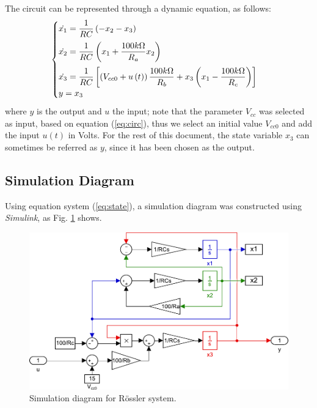 The circuit can be represented through a dynamic equation, as follows:
\begin{equation}
\begin{cases}
	\dot{x_1}=\dfrac{1}{RC}\left(-x_2-x_3\right)&\vspace{2mm}\\\vspace{2mm}
	\dot{x_2}=\dfrac{1}{RC}\left(x_1+\dfrac{100k\Omega}{R_a}x_2\right)&\\
	\dot{x_3}=\dfrac{1}{RC}\left[\left(V_{cc0}+u\left(t\right)\right)\dfrac{100k\Omega}{R_b}+x_3\left(x_1-\dfrac{100k\Omega}{R_c}\right)\right]&\\
	y = x_3
\end{cases}
\label{eq:state}
\end{equation}
where $y$ is the output and $u$ the input; note that the parameter $V_{cc}$ was selected as input, based on equation (\ref{eq:circ}), thus we select an initial value $V_{cc0}$ and add the input $u\left(t\right)$ in Volts. For the rest of this document, the state variable $x_3$ can sometimes be referred as $y$, since it has been chosen as the output.

\subsection{Simulation Diagram}
Using equation system (\ref{eq:state}), a simulation diagram was constructed using \textit{Simulink}, as Fig. \ref{fig:simulink} shows.
\begin{figure}[H]
    \centering
    \includegraphics[scale=0.55]{files/simulink.pdf}
    \caption{Simulation diagram for R\"ossler system.}
    \label{fig:simulink}
\end{figure}


